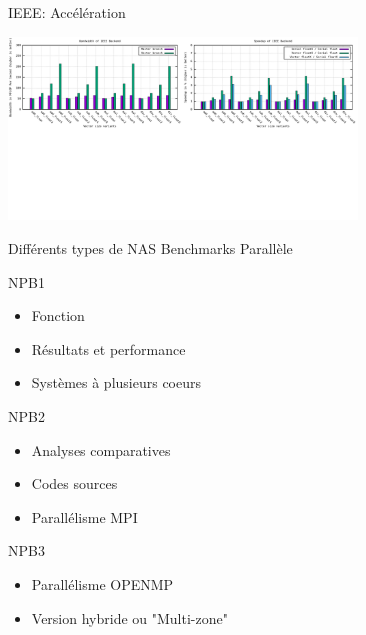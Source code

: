 \documentclass{beamer}
\begin{document}
\begin{frame}{IEEE: Accélération}

  \centering\includegraphics[width=350px]{../ressources/vm_ieee.png}
  
\end{frame}

\begin{frame}{Différents types de NAS Benchmarks Parallèle}

  \begin{block}{NPB1}
    \begin{itemize}
    \item Fonction
    \item Résultats et performance
    \item Systèmes à plusieurs coeurs
    \end{itemize}
  \end{block}
  
  \begin{block}{NPB2}
    \begin{itemize}
    \item Analyses comparatives
    \item Codes sources
    \item Parallélisme  MPI
    \end{itemize}
  \end{block}
  
  \begin{block}{NPB3}
    \begin{itemize}
    \item Parallélisme OPENMP
    \item Version hybride ou "Multi-zone" 
    \end{itemize}
  \end{block}

\end{frame}
\end{document}
